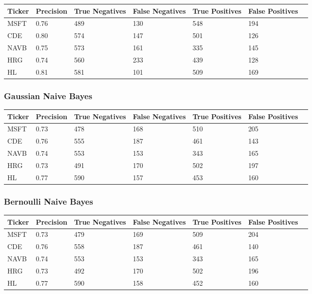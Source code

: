 \begin{center}
    \begin{tabular}{ | l | l | l | | l | l | l | p{5cm} |}
    \hline
    Ticker & Precision & True Negatives & False Negatives & True Positives & False Positives \\ \hline
    MSFT & 0.76 & 489 & 130 & 548 & 194 \\ \hline
    CDE & 0.80 & 574 & 147 & 501 & 126 \\ \hline
    NAVB & 0.75 & 573 & 161 & 335 & 145 \\ \hline
    HRG & 0.74 & 560 & 233 & 439 & 128 \\ \hline
    HL & 0.81 & 581 & 101 & 509 & 169 \\
    \hline
    \end{tabular}
\end{center}

\subsubsection{Gaussian Naive Bayes}

\begin{center}
    \begin{tabular}{ | l | l | l | | l | l | l | p{5cm} |}
    \hline
    Ticker & Precision & True Negatives & False Negatives & True Positives & False Positives \\ \hline
    MSFT & 0.73 & 478 & 168 & 510 & 205 \\ \hline
    CDE & 0.76 & 555 & 187 & 461 & 143 \\ \hline
    NAVB & 0.74 & 553 & 153 & 343 & 165 \\ \hline
    HRG & 0.73 & 491 & 170 & 502 & 197 \\ \hline
    HL & 0.77 & 590 & 157 & 453 & 160 \\
    \hline
    \end{tabular}
\end{center}

\subsubsection{Bernoulli Naive Bayes}

\begin{center}
    \begin{tabular}{ | l | l | l | | l | l | l | p{5cm} |}
    \hline
    Ticker & Precision & True Negatives & False Negatives & True Positives & False Positives \\ \hline
    MSFT & 0.73 & 479 & 169 & 509 & 204 \\ \hline
    CDE & 0.76 & 558 & 187 & 461 & 140 \\ \hline
    NAVB & 0.74 & 553 & 153 & 343 & 165 \\ \hline
    HRG & 0.73 & 492 & 170 & 502 & 196 \\ \hline
    HL & 0.77 & 590 & 158 & 452 & 160 \\
    \hline
    \end{tabular}
\end{center}

